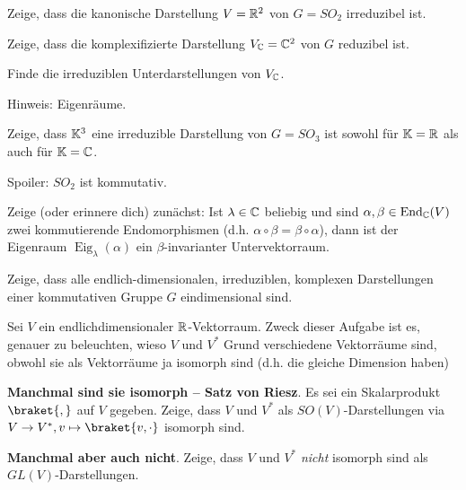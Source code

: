\begin{sheet}
\begin{problem}[title={Kanonische Darstellung von $SO_2$}]\label{ex:fundamentaldarstellung_von_so2}
\begin{subproblem}
Zeige, dass die kanonische Darstellung $V=\mathbb{R}^2$ von $G=SO_2$ irreduzibel ist.
\end{subproblem}
\begin{subproblem}
Zeige, dass die komplexifizierte Darstellung $V_{\mathbb{C}}=\mathbb{C}^2$ von $G$ reduzibel ist.
\end{subproblem}
\begin{subproblem}
Finde die irreduziblen Unterdarstellungen von $V_{\mathbb{C}}$.

Hinweis: Eigenräume.
\end{subproblem}
\end{problem}

\begin{problem}[title={Die kanonische Darstellung von $SO_3$ ist irreduzibel}]\label{ex:fundamentaldarstellung_von_so3}
Zeige, dass $\mathbb{K}^3$ eine irreduzible Darstellung von $G=SO_3$ ist sowohl für $\mathbb{K}=\mathbb{R}$ als auch für $\mathbb{K}=\mathbb{C}$.
\end{problem}

\begin{problem}[title={Was geht bei $SO_2$ schief?}]
Spoiler: $SO_2$ ist kommutativ.

\begin{subproblem}
Zeige (oder erinnere dich) zunächst: Ist $\lambda\in\mathbb{C}$ beliebig und sind $\alpha,\beta\in\operatorname{End}_{\mathbb{C}}(V)$ zwei kommutierende Endomorphismen (d.h. $\alpha\circ\beta=\beta\circ\alpha$), dann ist der Eigenraum $\operatorname{Eig}_\lambda(\alpha)$ ein $\beta$-invarianter Untervektorraum.
\end{subproblem}
\begin{subproblem}
Zeige, dass alle endlich-dimensionalen, irreduziblen, komplexen Darstellungen einer kommutativen Gruppe $G$ eindimensional sind.
\end{subproblem}
\end{problem}

\begin{problem}[title={(Nicht-)Isomorphie von $V$ und $V^\ast$}]
Sei $V$ ein endlichdimensionaler $\mathbb{R}$-Vektorraum. Zweck dieser Aufgabe ist es, genauer zu beleuchten, wieso $V$ und $V^\ast$ Grund verschiedene Vektorräume sind, obwohl sie als Vektorräume ja isomorph sind (d.h. die gleiche Dimension haben)
\begin{subproblem}
\textbf{Manchmal sind sie isomorph -- Satz von Riesz}.
Es sei ein Skalarprodukt $\braket{,}$ auf $V$ gegeben. Zeige, dass $V$ und $V^\ast$ als $SO(V)$-Darstellungen via $V\to V^\ast, v\mapsto \braket{v,\cdot}$ isomorph sind.
\end{subproblem}
\begin{subproblem}[difficulty={schwerer als man denkt}]
\textbf{Manchmal aber auch nicht}.
Zeige, dass $V$ und $V^\ast$ \emph{nicht} isomorph sind als $GL(V)$-Darstellungen.


\end{subproblem}
\end{problem}
\end{sheet}
